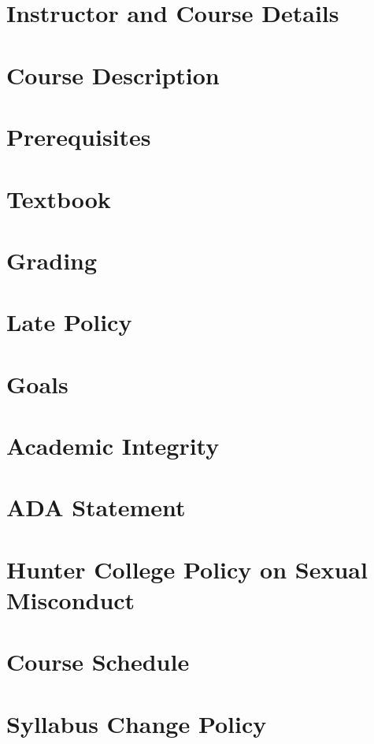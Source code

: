 \documentclass[11pt]{article} %
\title{\coursenumber\\\coursetitle}
\author{}
\date{\semester}
\begin{document}
\pagestyle{fancy} 
\fancyhead{}
\lhead{\coursenumber} %
\rhead{\semester} %

\maketitle

\thispagestyle{fancy}

\section*{Instructor and Course Details}

\section*{Course Description}

\section*{Prerequisites}

\section*{Textbook}
\section*{Grading}

\section*{Late Policy}

\section*{Goals}

% 
\section*{Academic Integrity}

\section*{ADA Statement}

\section*{Hunter College Policy on Sexual Misconduct}

\section*{Course Schedule}

\section*{Syllabus Change Policy}

\end{document}
